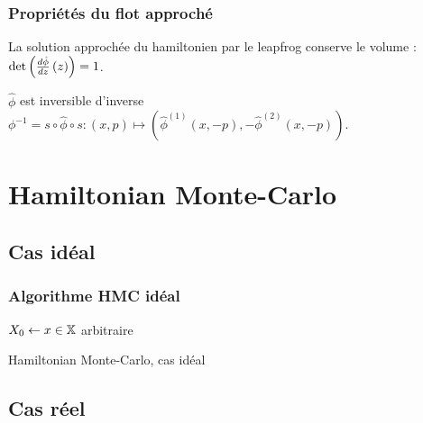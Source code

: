 \documentclass[10pt]{beamer}
\begin{document}
\begin{frame}
	\frametitle{Propriétés du flot approché}
	\begin{Prop}
		La solution approchée du hamiltonien par le leapfrog conserve le volume : $\det \left( \frac{d \hat \phi}{d z} \left( z \right) \right) = 1$.
	\end{Prop}
	\begin{Prop}
		$\hat \phi$ est inversible d'inverse $\phi^{-1} = s \circ \hat \phi \circ s : (x,p) \mapsto (\hat{\phi}^{(1)}(x,-p), -\hat{\phi}^{(2)}(x,-p))$.
	\end{Prop}
\end{frame}
 
\section{Hamiltonian Monte-Carlo}
 
\subsection{Cas idéal}
 
 
\begin{frame}
  \frametitle{Algorithme HMC idéal}
        \begin{center}
        	\begin{algorithm}[H]
        		$X_0 \leftarrow x \in \mathbb{X}$ arbitraire\;
        		\caption{Hamiltonian Monte-Carlo, cas idéal}
        		\label{algo:HMC-ideal}
        	\end{algorithm}
        \end{center}
\end{frame}
 
\subsection{Cas réel}
 
 
\end{document}
